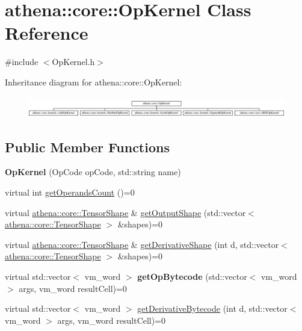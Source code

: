\hypertarget{classathena_1_1core_1_1_op_kernel}{}\section{athena\+:\+:core\+:\+:Op\+Kernel Class Reference}
\label{classathena_1_1core_1_1_op_kernel}


{\ttfamily \#include $<$Op\+Kernel.\+h$>$}

Inheritance diagram for athena\+:\+:core\+:\+:Op\+Kernel\+:\begin{figure}[H]
\begin{center}
\leavevmode
\includegraphics[height=0.929461cm]{d3/d9b/classathena_1_1core_1_1_op_kernel}
\end{center}
\end{figure}
\subsection*{Public Member Functions}
\begin{DoxyCompactItemize}
\item 
\mbox{\label{classathena_1_1core_1_1_op_kernel_a1adf0c5c97ce4d3e9c0155ea4bf48ab5}} 
{\bfseries Op\+Kernel} (Op\+Code op\+Code, std\+::string name)
\item 
virtual int \mbox{\hyperlink{classathena_1_1core_1_1_op_kernel_add97d4c132d80ecd9915acfedf7c9119}{get\+Operands\+Count}} ()=0
\item 
virtual \mbox{\hyperlink{classathena_1_1core_1_1_tensor_shape}{athena\+::core\+::\+Tensor\+Shape}} \& \mbox{\hyperlink{classathena_1_1core_1_1_op_kernel_a762e541463ffd089b47a8e6755c30fe1}{get\+Output\+Shape}} (std\+::vector$<$ \mbox{\hyperlink{classathena_1_1core_1_1_tensor_shape}{athena\+::core\+::\+Tensor\+Shape}} $>$ \&shapes)=0
\item 
virtual \mbox{\hyperlink{classathena_1_1core_1_1_tensor_shape}{athena\+::core\+::\+Tensor\+Shape}} \& \mbox{\hyperlink{classathena_1_1core_1_1_op_kernel_ad95af6dd184ce7ee9182ec7ca54b6c4d}{get\+Derivative\+Shape}} (int d, std\+::vector$<$ \mbox{\hyperlink{classathena_1_1core_1_1_tensor_shape}{athena\+::core\+::\+Tensor\+Shape}} $>$ \&shapes)=0
\item 
\mbox{\label{classathena_1_1core_1_1_op_kernel_a181a03e0a038151fda074a8c950f3003}} 
virtual std\+::vector$<$ vm\+\_\+word $>$ {\bfseries get\+Op\+Bytecode} (std\+::vector$<$ vm\+\_\+word $>$ args, vm\+\_\+word result\+Cell)=0
\item 
virtual std\+::vector$<$ vm\+\_\+word $>$ \mbox{\hyperlink{classathena_1_1core_1_1_op_kernel_ad500db1afc5a7c10acff8ecb8f1bee4d}{get\+Derivative\+Bytecode}} (int d, std\+::vector$<$ vm\+\_\+word $>$ args, vm\+\_\+word result\+Cell)=0
\end{DoxyCompactItemize}
